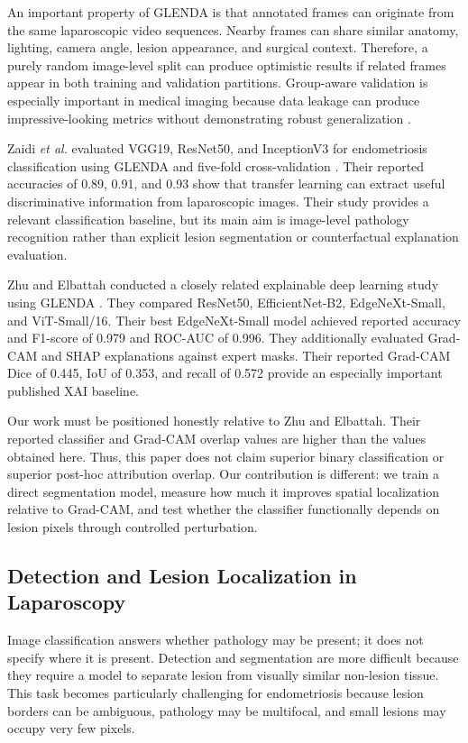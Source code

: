An important property of GLENDA is that annotated frames can originate from the same laparoscopic video sequences. Nearby frames can share similar anatomy, lighting, camera angle, lesion appearance, and surgical context. Therefore, a purely random image-level split can produce optimistic results if related frames appear in both training and validation partitions. Group-aware validation is especially important in medical imaging because data leakage can produce impressive-looking metrics without demonstrating robust generalization \cite{roberts2021pitfalls}.

Zaidi \emph{et al.} evaluated VGG19, ResNet50, and InceptionV3 for endometriosis classification using GLENDA and five-fold cross-validation \cite{zaidi2025deep}. Their reported accuracies of 0.89, 0.91, and 0.93 show that transfer learning can extract useful discriminative information from laparoscopic images. Their study provides a relevant classification baseline, but its main aim is image-level pathology recognition rather than explicit lesion segmentation or counterfactual explanation evaluation.

Zhu and Elbattah conducted a closely related explainable deep learning study using GLENDA \cite{zhu2025xai}. They compared ResNet50, EfficientNet-B2, EdgeNeXt-Small, and ViT-Small/16. Their best EdgeNeXt-Small model achieved reported accuracy and F1-score of 0.979 and ROC-AUC of 0.996. They additionally evaluated Grad-CAM and SHAP explanations against expert masks. Their reported Grad-CAM Dice of 0.445, IoU of 0.353, and recall of 0.572 provide an especially important published XAI baseline.

Our work must be positioned honestly relative to Zhu and Elbattah. Their reported classifier and Grad-CAM overlap values are higher than the values obtained here. Thus, this paper does not claim superior binary classification or superior post-hoc attribution overlap. Our contribution is different: we train a direct segmentation model, measure how much it improves spatial localization relative to Grad-CAM, and test whether the classifier functionally depends on lesion pixels through controlled perturbation.

\subsection{Detection and Lesion Localization in Laparoscopy}

Image classification answers whether pathology may be present; it does not specify where it is present. Detection and segmentation are more difficult because they require a model to separate lesion from visually similar non-lesion tissue. This task becomes particularly challenging for endometriosis because lesion borders can be ambiguous, pathology may be multifocal, and small lesions may occupy very few pixels.

